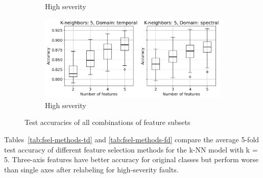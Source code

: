 \documentclass{llncs}
\begin{document}
\begin{figure}
\begin{subfigure}[b]{0.45\textwidth}
         \caption{High severity}
         \label{fig:all-models-severity-f-3}
     \end{subfigure}
     \hfill
     \begin{subfigure}[b]{0.45\textwidth}
         \centering
         \includegraphics[width=\textwidth]{fig/combinations-mafaulda/all-axis-severity-k5.png}
         \caption{High severity}
         \label{fig:all-models-severity-k-5}
     \end{subfigure}
     \caption{Test accuracies of all combinations of feature subsets}
\end{figure}

Tables~\ref{tab:fsel-methods-td} and \ref{tab:fsel-methods-fd} compare the average 5-fold test accuracy of different feature selection methods for the k-NN model with k = 5. Three-axis features have better accuracy for original classes but perform worse than single axes after relabeling for high-severity faults.
\end{document}
